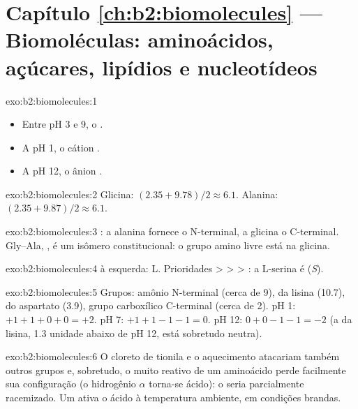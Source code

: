 \section*{Capítulo \ref{ch:b2:biomolecules} --- Biomoléculas: aminoácidos, açúcares, lipídios e nucleotídeos}

\begin{solution}{exo:b2:biomolecules:1}
\begin{itemize}
  \item Entre pH 3 e 9, o  .
  \item A pH 1, o cátion .
  \item A pH 12, o ânion .
\end{itemize}
\end{solution}

\begin{solution}{exo:b2:biomolecules:2}
Glicina: $(2.35 + 9.78)/2 \approx 6.1$. Alanina: $(2.35 + 9.87)/2 \approx 6.1$.
\end{solution}

\begin{solution}{exo:b2:biomolecules:3}
: a alanina fornece o N-terminal, a glicina o C-terminal. Gly--Ala,
, é um isômero constitucional: o grupo amino livre está na glicina.
\end{solution}

\begin{solution}{exo:b2:biomolecules:4}
 à esquerda: L. Prioridades  >  >  > : a L-serina é
(\textit{S}).
\end{solution}

\begin{solution}{exo:b2:biomolecules:5}
Grupos: amônio N-terminal (cerca de 9),  da lisina (10.7),  do aspartato
(3.9), grupo carboxílico C-terminal (cerca de 2). pH 1: $+1 +1 + 0 + 0 = +2$. pH 7: $+1 +1 -1 -1 = 0$. pH 12:
$0 + 0 - 1 - 1 = -2$ (a  da lisina, 1.3 unidade abaixo de pH 12, está sobretudo neutra).
\end{solution}

\begin{solution}{exo:b2:biomolecules:6}
O cloreto de tionila e o aquecimento atacariam também outros grupos e, sobretudo, o  muito
reativo de um aminoácido perde facilmente sua configuração (o hidrogênio $\alpha$ torna-se ácido): o
 seria parcialmente racemizado. Um  ativa o ácido à temperatura ambiente,
em condições brandas.
\end{solution}

